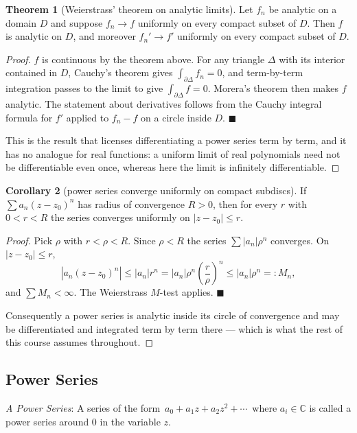 \documentclass[11pt,a4paper]{article}
\theoremstyle{definition}
\newtheorem{thm}{Theorem}[section]
\newtheorem{corollary}[thm]{Corollary}
\begin{document}
\begin{thm}[Weierstrass' theorem on analytic limits]
Let $f_n$ be analytic on a domain $D$ and suppose $f_n \rightarrow f$ uniformly
on every compact subset of $D$. Then $f$ is analytic on $D$, and moreover
$f_n' \rightarrow f'$ uniformly on every compact subset of $D$.
\end{thm}

\begin{proof}
$f$ is continuous by the theorem above. For any triangle $\Delta$ with its
interior contained in $D$, Cauchy's theorem gives
$\int_{\partial \Delta} f_n = 0$, and term-by-term integration passes to the
limit to give $\int_{\partial \Delta} f = 0$. Morera's theorem then makes $f$
analytic. The statement about derivatives follows from the Cauchy integral
formula for $f'$ applied to $f_n - f$ on a circle inside $D$. $\blacksquare$

This is the result that licenses differentiating a power series term by term, and
it has no analogue for real functions: a uniform limit of real polynomials need
not be differentiable even once, whereas here the limit is infinitely
differentiable.
\end{proof}

\begin{corollary}[power series converge uniformly on compact subdiscs]
If $\displaystyle\sum a_n (z - z_0)^n$ has radius of convergence $R > 0$, then
for every $r$ with $0 < r < R$ the series converges uniformly on
$\left|z - z_0\right| \leq r$.
\end{corollary}

\begin{proof}
Pick $\rho$ with $r < \rho < R$. Since $\rho < R$ the series
$\sum \left|a_n\right| \rho^n$ converges. On $\left|z - z_0\right| \leq r$,
$$\left|a_n (z - z_0)^n\right| \leq \left|a_n\right| r^n
= \left|a_n\right|\rho^n \left(\frac{r}{\rho}\right)^n
\leq \left|a_n\right| \rho^n =: M_n ,$$
and $\sum M_n < \infty$. The Weierstrass $M$-test applies. $\blacksquare$

Consequently a power series is analytic inside its circle of convergence and may
be differentiated and integrated term by term there --- which is what the rest of
this course assumes throughout.
\end{proof}

{\color[wave]{485}\subsection{Power Series}}
\textit{A Power Series}: A series of the form $\,a_0 + a_1z + a_2z^2 + \cdots\,$ where $a_i\in \mathbb{C}$ is called a power series around 0 in the variable $z$.\\
\end{document}
